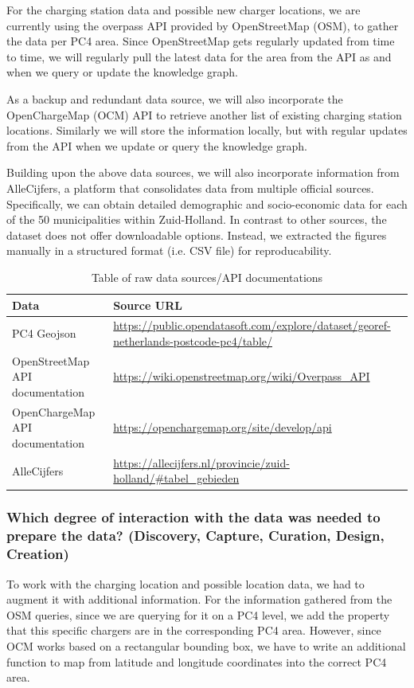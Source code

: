 \documentclass{article}
\newcommand{\question}[1]{#1}
\begin{document}
For the charging station data and possible new charger locations, we are currently using the overpass API provided by OpenStreetMap (OSM), to gather the data per PC4 area. Since OpenStreetMap gets regularly updated from time to time, we will regularly pull the latest data for the area from the API as and when we query or update the knowledge graph.

As a backup and redundant data source, we will also incorporate the OpenChargeMap (OCM) API to retrieve another list of existing charging station locations. Similarly we will store the information locally, but with regular updates from the API when we update or query the knowledge graph.

Building upon the above data sources, we will also incorporate information from AlleCijfers, a platform that consolidates data from multiple official sources. Specifically, we can obtain detailed demographic and socio-economic data for each of the 50 municipalities within Zuid-Holland. In contrast to other sources, the dataset does not offer downloadable options. Instead, we extracted the figures manually in a structured format (i.e. CSV file) for reproducability.

\begin{table}[htbp]
	\begin{tabularx}{\textwidth}{l|X}
		\textbf{Data}                   & \textbf{Source URL}                                                                          \\
		\hline
		PC4 Geojson                     & \url{https://public.opendatasoft.com/explore/dataset/georef-netherlands-postcode-pc4/table/} \\
		OpenStreetMap API documentation & \url{https://wiki.openstreetmap.org/wiki/Overpass_API}                                       \\
		OpenChargeMap API documentation & \url{https://openchargemap.org/site/develop/api}                                             \\
		AlleCijfers                     & \url{https://allecijfers.nl/provincie/zuid-holland/#tabel_gebieden}
	\end{tabularx}
	\caption{Table of raw data sources/API documentations}

\end{table}

\question{\subsubsection*{Which degree of interaction with the data was needed to prepare the data? (Discovery, Capture, Curation, Design, Creation)}}
To work with the charging location and possible location data, we had to augment it with additional information. For the information gathered from the OSM queries, since we are querying for it on a PC4 level, we add the property that this specific chargers are in the corresponding PC4 area. However, since OCM works based on a rectangular bounding box, we have to write an additional function to map from latitude and longitude coordinates into the correct PC4 area.
\end{document}
